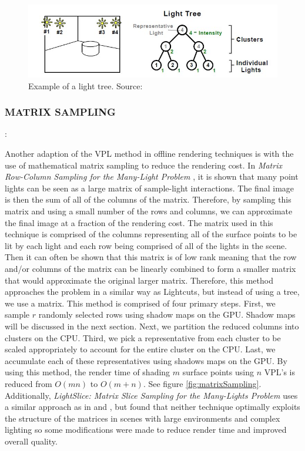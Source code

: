 \begin{figure}[h!]
  \centering
    \includegraphics[width=1.0\textwidth]{lightTree.jpg}
  \caption{Example of a light tree. Source: \protect\cite{Walter2005}}
	\label{fig:lightTree}
\end{figure}

\subsubsection{MATRIX SAMPLING}: 

Another adaption of the VPL method in offline rendering techniques is with the use of mathematical matrix sampling to reduce the rendering cost.  In \textit{Matrix Row-Column Sampling for the Many-Light Problem} \cite{Havsan2007}, it is shown that many point lights can be seen as a large matrix of sample-light interactions.  The final image is then the sum of all of the columns of the matrix.  Therefore, by sampling this matrix and using a small number of the rows and columns, we can approximate the final image at a fraction of the rendering cost.  The matrix used in this technique is comprised of the columns representing all of the surface points to be lit by each light and each row being comprised of all of the lights in the scene.  Then it can often be shown that this matrix is of low rank meaning that the row and/or columns of the matrix can be linearly combined to form a smaller matrix that would approximate the original larger matrix.  Therefore, this method approaches the problem in a similar way as Lightcuts, but instead of using a tree, we use a matrix.  This method is comprised of four primary steps.  First, we sample $r$ randomly selected rows using shadow maps on the GPU.  Shadow maps will be discussed in the next section.  Next, we partition the reduced columns into clusters on the CPU.  Third, we pick a representative from each cluster to be scaled appropriately to account for the entire cluster on the CPU.  Last, we accumulate each of these representatives using shadows maps on the GPU.  By using this method, the render time of shading $m$ surface points using $n$ VPL's is reduced from $O(mn)$ to $O(m+n)$.  See figure \ref{fig:matrixSampling}.  Additionally, \textit{LightSlice: Matrix Slice Sampling for the Many-Lights Problem} \cite{Ou2011} uses a similar approach as in \cite{Havsan2007} and \cite{Walter2005}, but found that neither technique optimally exploits the structure of the matrices in scenes with large environments and complex lighting so some modifications were made to reduce render time and improved overall quality.

